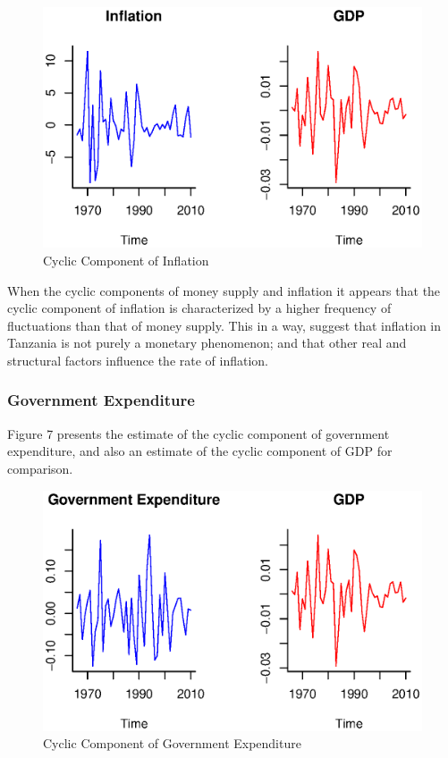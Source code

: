 \documentclass[12pt,a4paper,final]{article}
\begin{document}
\begin{figure}[ht]
\centering
\begin{small}
\caption{Cyclic Component of Inflation}
\end{small}
\includegraphics[scale=0.601]{inflation.eps} 
\end{figure}

When the cyclic components of money supply and inflation it appears that the cyclic component of inflation is characterized by a higher frequency of fluctuations than that of money supply. This in a way, suggest that inflation in Tanzania is not purely a monetary phenomenon; and that other real and structural factors influence the rate of inflation.

\subsubsection{Government Expenditure}

Figure 7 presents the estimate of the cyclic component of government expenditure, and also an estimate of the cyclic component of GDP for comparison.

\begin{figure}[ht]
\centering
\begin{small}
\caption{Cyclic Component of Government Expenditure}
\end{small}
\includegraphics[scale=0.601]{gov_expend.eps} 
\end{figure}
\end{document}
